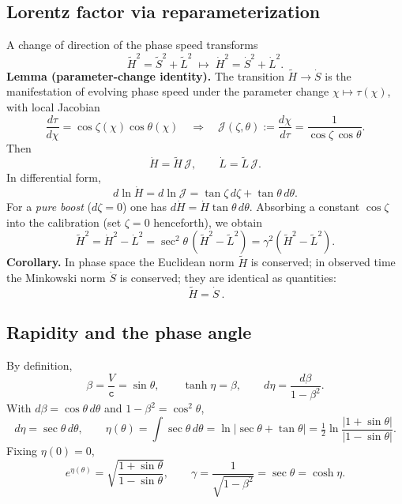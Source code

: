 \documentclass[11pt]{article}
\numberwithin{equation}{section}
\begin{document}
\subsection{Lorentz factor via reparameterization}
A change of direction of the phase speed transforms
\begin{equation}
\tilde{H}^2=\tilde{S}^2+\tilde{L}^2 \;\longmapsto\;
\dot{H}^2=\dot{S}^2+\dot{L}^2.
\label{eq:351}
\end{equation}
\textbf{Lemma (parameter-change identity).} The transition $\tilde{H}\to\dot{S}$ is the manifestation of evolving phase speed under the parameter change $\chi\mapsto \tau(\chi)$, with local Jacobian
\begin{equation}
\frac{d\tau}{d\chi}=\cos\zeta(\chi)\cos\theta(\chi)
\quad\Rightarrow\quad
\mathcal{J}(\zeta,\theta):=\frac{d\chi}{d\tau}=\frac{1}{\cos\zeta\,\cos\theta}.
\label{eq:353}
\end{equation}
Then
\begin{equation}
\dot{H}=\tilde{H}\,\mathcal{J},\qquad \dot{L}=\tilde{L}\,\mathcal{J}.
\label{eq:354}
\end{equation}
In differential form,
\begin{equation}
d\ln\dot{H}=d\ln\mathcal{J}=\tan\zeta\,d\zeta+\tan\theta\,d\theta.
\label{eq:355}
\end{equation}
For a \emph{pure boost} ($d\zeta=0$) one has $d\dot{H}=\dot{H}\tan\theta\,d\theta$. Absorbing a constant $\cos\zeta$ into the calibration (set $\zeta=0$ henceforth), we obtain
\begin{equation}
\tilde{H}^2=\dot{H}^2-\dot{L}^2=\sec^2\theta\,(\tilde{H}^2-\tilde{L}^2)=\gamma^2(\tilde{H}^2-\tilde{L}^2).
\label{eq:356}
\end{equation}
\textbf{Corollary.} In phase space the Euclidean norm $\tilde{H}$ is conserved; in observed time the Minkowski norm $\dot{S}$ is conserved; they are identical as quantities:
\begin{equation}
\boxed{\ \tilde{H}=\dot{S}\ }.
\label{eq:357}
\end{equation}

\subsection{Rapidity and the phase angle}
By definition,
\begin{equation}
\beta=\frac{V}{\mathtt{c}}=\sin\theta,\qquad \tanh\eta=\beta,\qquad
d\eta=\frac{d\beta}{1-\beta^2}.
\label{eq:361}
\end{equation}
With $d\beta=\cos\theta\,d\theta$ and $1-\beta^2=\cos^2\theta$,
\begin{equation}
d\eta=\sec\theta\,d\theta,\qquad
\eta(\theta)=\int\sec\theta\,d\theta
=\ln|\sec\theta+\tan\theta|
=\tfrac12\ln\frac{|1+\sin\theta|}{|1-\sin\theta|}.
\label{eq:364}
\end{equation}
Fixing $\eta(0)=0$,
\begin{equation}
e^{\eta(\theta)}=\sqrt{\frac{1+\sin\theta}{1-\sin\theta}},\qquad
\gamma=\frac{1}{\sqrt{1-\beta^2}}=\sec\theta=\cosh\eta.
\label{eq:365}
\end{equation}
\end{document}
